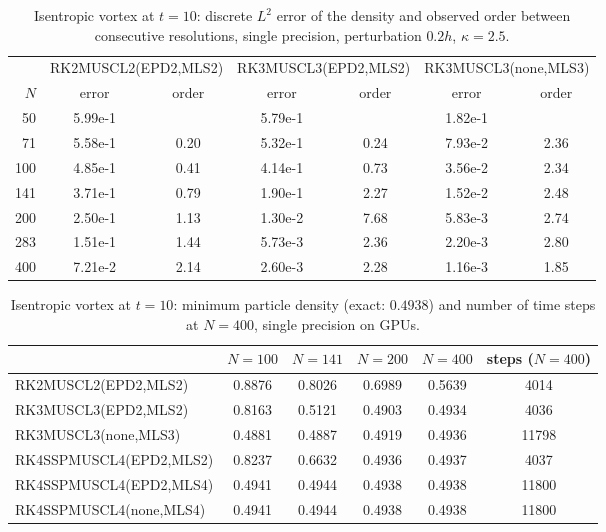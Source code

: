 \documentclass[11pt,a4paper]{article}
\numberwithin{equation}{section}
\begin{document}
\begin{table}[!htbp]
\centering
\caption{Isentropic vortex at $t=10$: discrete $L^2$ error of the density and observed order between consecutive resolutions, single precision, perturbation $0.2h$, $\kappa=2.5$.}\label{tab:vortex}
\small
\begin{tabular}{rcccccc}
\toprule
& \multicolumn{2}{c}{RK2MUSCL2(EPD2,MLS2)} & \multicolumn{2}{c}{RK3MUSCL3(EPD2,MLS2)} & \multicolumn{2}{c}{RK3MUSCL3(none,MLS3)}\\
\cmidrule(lr){2-3}\cmidrule(lr){4-5}\cmidrule(lr){6-7}
$N$ & error & order & error & order & error & order\\
\midrule
50 & 5.99e-1 & & 5.79e-1 & & 1.82e-1 & \\
71 & 5.58e-1 & 0.20 & 5.32e-1 & 0.24 & 7.93e-2 & 2.36\\
100 & 4.85e-1 & 0.41 & 4.14e-1 & 0.73 & 3.56e-2 & 2.34\\
141 & 3.71e-1 & 0.79 & 1.90e-1 & 2.27 & 1.52e-2 & 2.48\\
200 & 2.50e-1 & 1.13 & 1.30e-2 & 7.68 & 5.83e-3 & 2.74\\
283 & 1.51e-1 & 1.44 & 5.73e-3 & 2.36 & 2.20e-3 & 2.80\\
400 & 7.21e-2 & 2.14 & 2.60e-3 & 2.28 & 1.16e-3 & 1.85\\
\bottomrule
\end{tabular}
\end{table}

\begin{table}[!htbp]
\centering
\caption{Isentropic vortex at $t=10$: minimum particle density (exact: $0.4938$) and number of time steps at $N=400$, single precision on GPUs.}\label{tab:vortex_min}
\small
\begin{tabular}{lccccc}
\toprule
& $N=100$ & $N=141$ & $N=200$ & $N=400$ & steps ($N=400$)\\
\midrule
RK2MUSCL2(EPD2,MLS2) & 0.8876 & 0.8026 & 0.6989 & 0.5639 & 4014\\
RK3MUSCL3(EPD2,MLS2) & 0.8163 & 0.5121 & 0.4903 & 0.4934 & 4036\\
RK3MUSCL3(none,MLS3) & 0.4881 & 0.4887 & 0.4919 & 0.4936 & 11798\\
RK4SSPMUSCL4(EPD2,MLS2) & 0.8237 & 0.6632 & 0.4936 & 0.4937 & 4037\\
RK4SSPMUSCL4(EPD2,MLS4) & 0.4941 & 0.4944 & 0.4938 & 0.4938 & 11800\\
RK4SSPMUSCL4(none,MLS4) & 0.4941 & 0.4944 & 0.4938 & 0.4938 & 11800\\
\bottomrule
\end{tabular}
\end{table}
\end{document}

